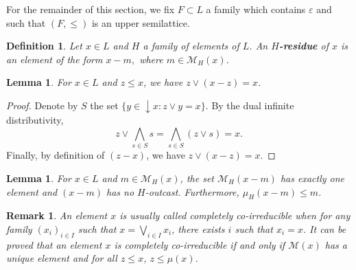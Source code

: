 \documentclass{article}
\newtheorem{lemma}[theorem]{Lemma}
\newtheorem{definition}[theorem]{Definition}
\newtheorem{remark}[theorem]{Remark}
\begin{document}
{For the remainder of this section, we fix $F \subset L$ a family which contains $\varepsilon$ and such that $(F,\le)$ is an upper semilattice.}

\begin{definition}
{Let \(x\in L\) and $H$ a family of elements of $L$. An \textbf{\(H\)-residue} of \(x\) is an element of the form \(x-m,\) where \(m\in\mathcal{M}_H(x)\).}
\end{definition}

\begin{lemma}\label{lemma.prop.fund.cosubstr}
    For $x \in L$ and $z \le x$, we have $z \vee (x-z) = x$.
\end{lemma}

\begin{proof}
    {Denote by $S$ 
    the set $\{y \in \mathop{\downarrow}x : z \vee y = x\}$. By the dual infinite distributivity, 
    \[z \vee \bigwedge_{s \in S} s = \bigwedge_{s \in S} (z \vee s) = x.\]
    Finally, by definition of $(z-x)$, we have $z \vee (x-z) = x$.}
\end{proof}


\begin{lemma}\label{lemma.complement.type1}
    For $x \in L$ and $m \in \mathcal{M}_H(x)$, the set $\mathcal{M}_H(x - m)$ has exactly one element and $(x-m)$ has no $H$-outcast. Furthermore, $\mu_H(x-m) \le m$. 
\end{lemma}

\begin{remark}
    {An element $x$ is usually called completely co-irreducible when for any family $(x_i)_{i \in I}$ such that $x = \bigvee_{i \in I} x_i$, there exists $i$ such that $x_i = x$. It can be proved that an element $x$ is completely co-irreducible if and only if $\mathcal{M}(x)$ has a unique element and for all $z \le x$, $z \le \mu(x)$.}
\end{remark}
\end{document}
